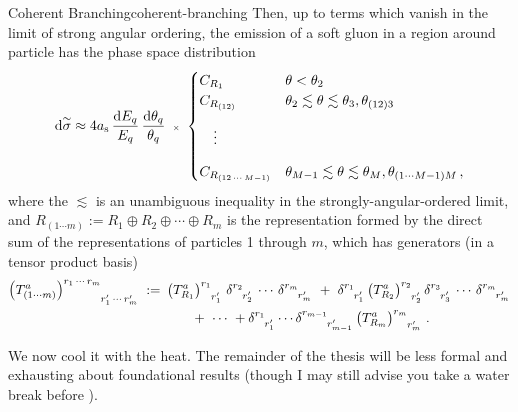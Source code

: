 \begin{lemma}{Coherent Branching}{coherent-branching}
    Then, up to terms which vanish in the limit of strong angular ordering, the emission of a soft gluon in a region around particle has the phase space distribution
    \begin{align}
        \label{eq:qcd-coherent-branching}
        \dsigmatilde
        \approx
        4 \as
        \,
        \frac{\dd E_q}{E_q}
        \,
        \frac{\dd \theta_q}{\theta_q}
        \,\,\,
        {\scriptscriptstyle\times}
        \,\,
        \begin{cases}
            C_{R_1}
            & \theta < \theta_{2}
            \\
            C_{R_{(12)}}
            & \theta_{2} \lesssim \theta \lesssim
            \theta_{3}, \theta_{(12)3}
            \\[2ex]
            \quad
            \vdots
            &
            \\[2ex]
            C_{R_{(12\,\cdots\,M-1)}}
            & \theta_{M-1} \lesssim \theta \lesssim
            \theta_{M}, \theta_{(1\cdots M-1)M}
            \,,
        \end{cases}
    \end{align}
    where the \(\lesssim\) is an unambiguous inequality in the strongly-angular-ordered limit, and \(R_{(1\cdots m)} := R_1 \oplus R_2 \oplus \cdots \oplus R_m\) is the representation formed by the direct sum of the representations of particles 1 through \(m\), which has generators (in a tensor product basis)
    \begin{align}
        \le(T^a_{(1\cdots m)}\ri)\indices{^{r_1\,\cdots\,r_m}_{r'_1\,\cdots\,r'_m}}
        \,\,
        :=&
        \,\,
        \le(T^a_{R_1}\ri)\indices{^{r_1}_{r'_1}}
        \,
        \delta\indices{^{r_2}_{r'_2}}\,\cdots\,\delta\indices{^{r_m}_{r'_m}}
        \,\,
        +
        \,\,
        \delta\indices{^{r_1}_{r'_1}}
        \le(T^a_{R_2}\ri)\indices{^{r_2}_{r'_2}}
        \delta\indices{^{r_3}_{r'_3}}\,\cdots\,\delta\indices{^{r_m}_{r'_m}}
        \notag
        \\
        &\qquad
        \,\,
        +
        \,\,
        \cdots
        \,\,
        +
        \delta\indices{^{r_1}_{r'_1}}
        \cdots
        \delta\indices{^{r_{m-1}}_{r'_{m-1}}}
        \le(T^a_{R_m}\ri)\indices{^{r_m}_{r'_m}}
        \,.
    \end{align}
\end{lemma}



We now cool it with the heat.
%
The remainder of the thesis will be less formal and exhausting about foundational results (though I may still advise you take a water break before ).



